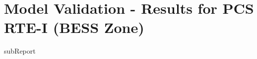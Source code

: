 


    \section{Model Validation - Results for PCS RTE-I (BESS Zone)}

    {{subReport}}
    \newpage
